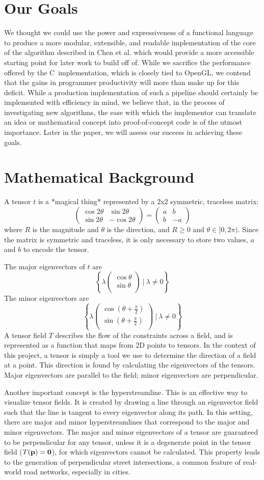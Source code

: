 \documentclass[twocolumn]{article}
\newcommand{\sqmat}[4]{\ensuremath{
    \left(\begin{array}{cc}
        #1 & #2 \\
        #3 & #4
    \end{array}\right)}}
\newcommand{\mkvec}[2]{\ensuremath{
    \left(\begin{array}{c}
        #1 \\
        #2 \\
    \end{array}\right)}}
\def \cpp {C\nolinebreak[4]\hspace{-.05em}\raisebox{.4ex}{\tiny\bf ++}~}
\begin{document}
\section{Our Goals}
We thought we could use the power and expressiveness of a functional language
to produce a more modular, extensible, and readable implementation of the core
of the algorithm described in Chen et al. which would provide a more
accessible starting point for later work to build off of. While we sacrifice
the performance offered by the \cpp implementation, which is closely tied to
OpenGL, we contend that the gains in programmer productivity will more than
make up for this deficit. While a production implementation of such a pipeline
should certainly be implemented with efficiency in mind, we believe that, in
the process of investigating new algorithms, the ease with which the
implementor can translate an idea or mathematical concept into proof-of-concept
code is of the utmost importance. Later in the paper, we will assess our
success in achieving these goals.

\section{Mathematical Background}
A tensor $t$ is a *magical thing* represented by a 2x2 symmetric, traceless
matrix:
\[
    \sqmat{\cos{2\theta}}{\sin{2\theta}}{\sin{2\theta}}{-\cos{2\theta}}
    = \sqmat{a}{b}{b}{-a}
\]
where $R$ is the magnitude and $\theta$ is the direction, and
$R\geq0 \textrm{ and } \theta\in[0,2\pi)$. Since the matrix is symmetric and
traceless, it is only necessary to store two values, $a$ and $b$ to encode
the tensor.

The major eigenvectors of $t$ are
\[
    \left\{
        \lambda\mkvec{\cos{\theta}}{\sin{\theta}} ~|~ \lambda \neq 0
    \right\}
\]
The minor eigenvectors are
\[
    \left\{
        \lambda\mkvec
                {\cos{(\theta+\frac{\pi}{2})}}
                {\sin{(\theta+\frac{\pi}{2})}}
        ~|~ \lambda \neq 0
    \right\}
\]
A tensor field $T$ describes the flow of the constraints across a field,
and is represented as a function that maps from 2D points to tensors. In the
context of this project, a tensor is simply a tool we use to determine the
direction of a field at a point. This direction is found by calculating the
eigenvectors of the tensors. Major eigenvectors are parallel to the field;
minor eigenvectors are perpendicular.

Another important concept is the hyperstreamline. This is an effective way to
visualize tensor fields. It is created by drawing a line through an eigenvector
field such that the line is tangent to every eigenvector along its path. In
this setting, there are major and minor hyperstreamlines that correspond to the
major and minor eigenvectors. The major and minor eigenvectors of a tensor are
guaranteed to be perpendicular for any tensor, unless it is a degenerate point
in the tensor field ($T(\bf p)=0$), for which eigenvectors cannot be
calculated. This property leads to the generation of perpendicular street
intersections, a common feature of real-world road networks, especially in
cities.
\end{document}
